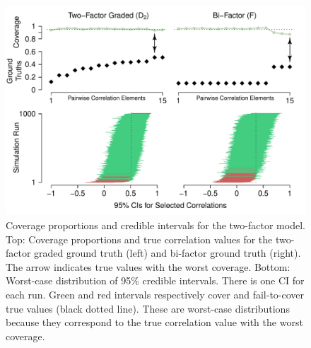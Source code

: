 \documentclass[man, 12pt]{apa7} %
\begin{document}
\begin{figure}[htbp]
    \centering  %
    \includegraphics[width=\linewidth, height=1.1\linewidth, keepaspectratio]{_figs/coverage.pdf}
    \caption{Coverage proportions and credible intervals for the two-factor model.  Top: Coverage proportions and true correlation values for the two-factor graded  ground truth (left) and bi-factor ground truth (right).  The arrow indicates true values with the worst coverage.  Bottom: Worst-case distribution of 95\% credible intervals.  There is one CI for each run.  Green and red intervals respectively cover and fail-to-cover true values (black dotted line). These are worst-case distributions because they correspond to the true correlation value with the worst coverage.} 
    \label{fig:coverage}
\end{figure}
\end{document}
